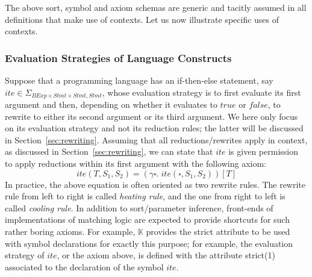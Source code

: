 \documentclass[acmsmall,review,anonymous]{acmart}
\newcommand{\K}{$\mathbb{K}$\xspace}
\newcommand{\hole}{\square}
\newcommand{\BExp}{\textit{BExp}}
\newcommand{\ttrue}{\textit{true}}
\newcommand{\ffalse}{\textit{false}}
\newcommand{\Stmt}{\textit{Stmt}}
\newcommand{\ite}{\textit{ite}}
\begin{document}
The above sort, symbol and axiom schemas are generic and tacitly assumed in
all definitions that make use of contexts.
Let us now illustrate specific uses of contexts.

\subsubsection{Evaluation Strategies of Language Constructs}
\label{sec:evaluationstrategies}
Suppose that a programming language has an if-then-else statement,
say $\ite\in\Sigma_{\BExp\times\Stmt\times\Stmt,\Stmt}$,
whose evaluation strategy is to first evaluate its first argument and then, 
depending
on whether it evaluates to $\ttrue$ or $\ffalse$, to rewrite to either
its second argument or its third argument.
We here only focus on its evaluation strategy and not its reduction rules;
the latter will be discussed in Section~\ref{sec:rewriting}.
Assuming that all reductions/rewrites apply in context, as discussed in
Section~\ref{sec:rewriting}, we can state that $\ite$ is given permission to
apply reductions within its first argument with the following axiom:
$$
\ite(T,S_1,S_2) = (\gamma\hole.\;\ite(\hole,S_1,S_2))[T]
$$
In practice, the above equation is often oriented as two rewrite rules.
The rewrite rule from left to right is called \emph{heating rule},
and the one from right to left is called \emph{cooling rule}.
In addition to sort/parameter inference, front-ends of implementations of
matching logic are expected to provide shortcuts for such rather boring
axioms.
For example, \K provides the \textsf{strict} attribute to be used with symbol
declarations for exactly this purpose; for example, the evaluation strategy
of $\ite$, or the axiom above, is defined with the attribute
\textsf{strict(1)} associated to the declaration of the symbol $\ite$.
\end{document}

